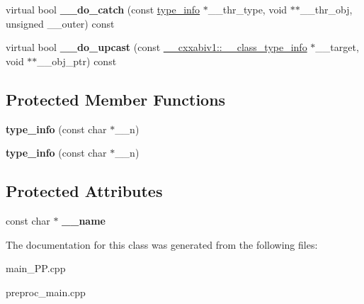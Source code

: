 \begin{DoxyCompactItemize}
\item 
\hypertarget{classstd_1_1type__info_affdcfba3b0a462785bba4d02bfa16335}{virtual bool {\bfseries \+\_\+\+\_\+do\+\_\+catch} (const \hyperlink{classstd_1_1type__info}{type\+\_\+info} $\ast$\+\_\+\+\_\+thr\+\_\+type, void $\ast$$\ast$\+\_\+\+\_\+thr\+\_\+obj, unsigned \+\_\+\+\_\+outer) const }\label{classstd_1_1type__info_affdcfba3b0a462785bba4d02bfa16335}

\item 
\hypertarget{classstd_1_1type__info_a735e0aef98d6394a37cd9a703c67704c}{virtual bool {\bfseries \+\_\+\+\_\+do\+\_\+upcast} (const \hyperlink{class____cxxabiv1_1_1____class__type__info}{\+\_\+\+\_\+cxxabiv1\+::\+\_\+\+\_\+class\+\_\+type\+\_\+info} $\ast$\+\_\+\+\_\+target, void $\ast$$\ast$\+\_\+\+\_\+obj\+\_\+ptr) const }\label{classstd_1_1type__info_a735e0aef98d6394a37cd9a703c67704c}

\end{DoxyCompactItemize}
\subsection*{Protected Member Functions}
\begin{DoxyCompactItemize}
\item 
\hypertarget{classstd_1_1type__info_a86d2ac2c62a76c136df68c623065d81e}{{\bfseries type\+\_\+info} (const char $\ast$\+\_\+\+\_\+n)}\label{classstd_1_1type__info_a86d2ac2c62a76c136df68c623065d81e}

\item 
\hypertarget{classstd_1_1type__info_a86d2ac2c62a76c136df68c623065d81e}{{\bfseries type\+\_\+info} (const char $\ast$\+\_\+\+\_\+n)}\label{classstd_1_1type__info_a86d2ac2c62a76c136df68c623065d81e}

\end{DoxyCompactItemize}
\subsection*{Protected Attributes}
\begin{DoxyCompactItemize}
\item 
\hypertarget{classstd_1_1type__info_ac18c5fbe96da7de9262d92cc62e6382c}{const char $\ast$ {\bfseries \+\_\+\+\_\+name}}\label{classstd_1_1type__info_ac18c5fbe96da7de9262d92cc62e6382c}

\end{DoxyCompactItemize}


The documentation for this class was generated from the following files\+:\begin{DoxyCompactItemize}
\item 
main\+\_\+\+P\+P.\+cpp\item 
preproc\+\_\+main.\+cpp\end{DoxyCompactItemize}
